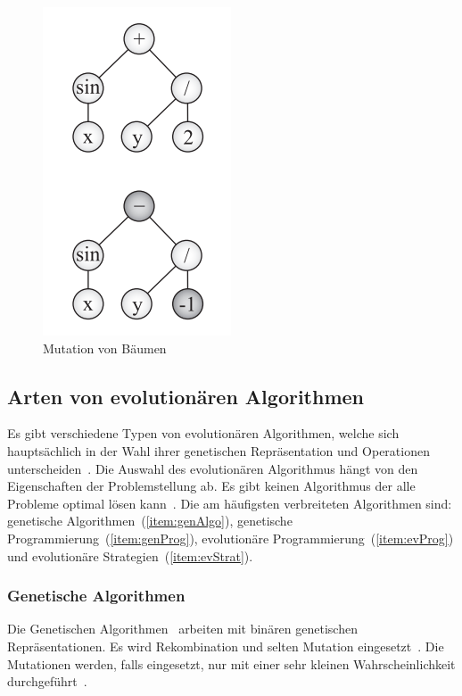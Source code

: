         \begin{figure}[H]
            \includegraphics[scale=0.8,center]{graphics/mutation_tree}
            \caption[\protect{}, S.29]{Mutation von Bäumen\label{fig:MutationTree}}
        \end{figure}

    \subsection{Arten von evolutionären Algorithmen\label{sub:artenEvAlgos}}

      Es gibt verschiedene Typen von evolutionären Algorithmen, welche sich hauptsächlich in der Wahl ihrer
      genetischen Repräsentation und Operationen unterscheiden~\cite{book:introEvComp}.
      Die Auswahl des evolutionären Algorithmus hängt von den Eigenschaften der Problemstellung ab.
      Es gibt keinen Algorithmus der alle Probleme optimal lösen kann~\cite{book:genAlgoDataStructsEvProg}.
      Die am häufigsten verbreiteten Algorithmen sind: genetische Algorithmen~(\vref{item:genAlgo}),
      genetische Programmierung~(\vref{item:genProg}), evolutionäre Programmierung~(\vref{item:evProg})
      und evolutionäre Strategien~(\vref{item:evStrat}).

      \subsubsection{Genetische Algorithmen\label{item:genAlgo}}

        Die Genetischen Algorithmen~\cite{book:adapNaturalArtSys} arbeiten mit binären genetischen Repräsentationen.
        Es wird Rekombination und selten Mutation eingesetzt~\cite[S.128]{book:evAlgo}.
        Die Mutationen werden, falls eingesetzt,
        nur mit einer sehr kleinen Wahrscheinlichkeit durchgeführt~\cite[S.128]{book:evAlgo}.

